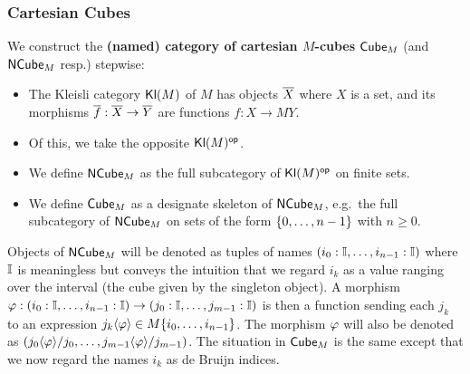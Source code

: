 \documentclass[a4paper]{article}
\begin{document}
\subsubsection{Cartesian Cubes}
\begin{definition}
	We construct the \textbf{(named) category of cartesian $M$-cubes} ${\mathsf{Cube}}_M$ (and ${\mathsf{NCube}}_M$ resp.) stepwise:
	\begin{itemize}
		\item The Kleisli category ${\mathsf{Kl}}(M)$ of $M$ has objects ${\overline{X}}$ where $X$ is a set, and its morphisms ${\overline{f}} : {\overline{X}} \to {\overline{Y}}$ are functions $f : X \to MY$.
		\item Of this, we take the opposite ${\mathsf{Kl}}(M)^{\mathsf{op}}$.
		\item We define ${\mathsf{NCube}}_M$ as the full subcategory of ${\mathsf{Kl}}(M)^{\mathsf{op}}$ on finite sets.
		\item We define ${\mathsf{Cube}}_M$ as a designate skeleton of ${\mathsf{NCube}}_M$, e.g.\ the full subcategory of ${\mathsf{NCube}}_M$ on sets of the form $\mathopen{}\left\{ 0, \ldots, n-1 \right\}\mathclose{}$ with $n \geq 0$.
	\end{itemize}
\end{definition}
Objects of ${\mathsf{NCube}}_M$ will be denoted as tuples of names $(i_0 : {\mathbb I}, \ldots, i_{n-1} : {\mathbb I})$ where ${\mathbb I}$ is meaningless but conveys the intuition that we regard $i_k$ as a value ranging over the interval (the cube given by the singleton object).
A morphism $\varphi : (i_0 : {\mathbb I}, \ldots, i_{n-1} : {\mathbb I}) \to (j_0 : {\mathbb I}, \ldots, j_{m-1} : {\mathbb I})$ is then a function sending each $j_k$ to an expression $j_k \langle \varphi \rangle \in M\mathopen{}\left\{ i_0, \ldots, i_{n-1} \right\}\mathclose{}$.
The morphism $\varphi$ will also be denoted as $(j_0 \langle \varphi \rangle / j_0, \ldots, j_{m-1} \langle \varphi \rangle / j_{m-1})$.
The situation in ${\mathsf{Cube}}_M$ is the same except that we now regard the names $i_k$ as de Bruijn indices.
\end{document}
